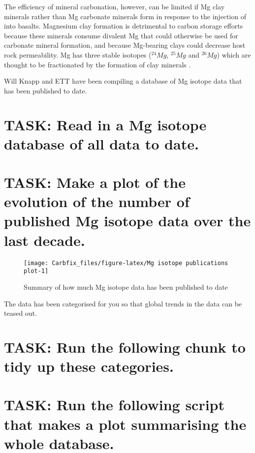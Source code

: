 \documentclass[nofonts,x11names]{tufte-handout}
\begin{document}
\noindent The efficiency of mineral carbonation, however, can be limited
if Mg clay minerals rather than Mg carbonate minerals form in response
to the injection of  into basalts. Magnesium clay formation is
detrimental to carbon storage efforts because these minerals consume
divalent Mg that could otherwise be used for carbonate mineral
formation, and because Mg-bearing clays could decrease host rock
permeability. Mg has three stable isotopes (\(^{24}Mg\), \(^{25}Mg\) and
\(^{26}Mg\)) which are thought to be fractionated by the formation of
clay minerals \citet{Hindshaw:2020aa}.

\noindent Will Knapp and ETT have been compiling a database of Mg
isotope data that has been published to date.

\section{TASK: Read in a Mg isotope database of all data to
date.}\label{task-read-in-a-mg-isotope-database-of-all-data-to-date.}

\section{TASK: Make a plot of the evolution of the number of published
Mg isotope data over the last
decade.}\label{task-make-a-plot-of-the-evolution-of-the-number-of-published-mg-isotope-data-over-the-last-decade.}

\begin{figure}
\texttt{[image: Carbfix\_files/figure-latex/Mg isotope publications plot-1]} \caption[Summary of how much Mg isotope data has been published to date]{Summary of how much Mg isotope data has been published to date}\label{fig:Mg isotope publications plot}
\end{figure}

\noindent The data has been categorised for you so that global trends in
the data can be teased out.

\section{TASK: Run the following chunk to tidy up these
categories.}\label{task-run-the-following-chunk-to-tidy-up-these-categories.}

\section{TASK: Run the following script that makes a plot summarising
the whole
database.}\label{task-run-the-following-script-that-makes-a-plot-summarising-the-whole-database.}
\end{document}
